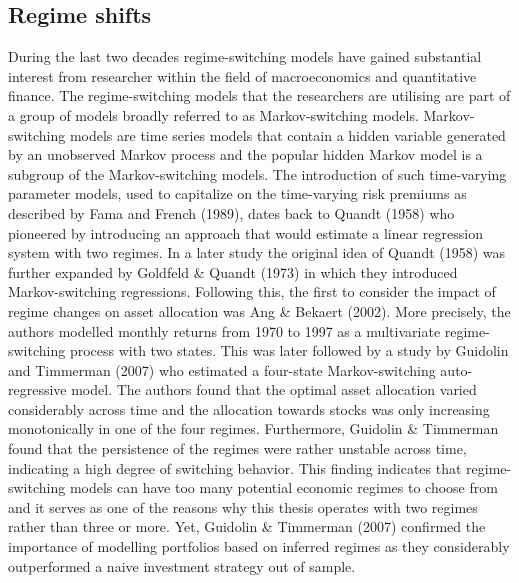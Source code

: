 \subsection{Regime shifts}
During the last two decades regime-switching models have gained substantial interest from researcher within the field of macroeconomics and quantitative finance. The regime-switching models that the researchers are utilising are part of a group of models broadly referred to as Markov-switching models. Markov-switching models are time series models that contain a hidden variable generated by an unobserved Markov process and the popular hidden Markov model is a subgroup of the Markov-switching models. The introduction of such time-varying parameter models, used to capitalize on the time-varying risk premiums as described by Fama and French (1989), dates back to Quandt (1958) who pioneered by introducing an approach that would estimate a linear regression system with two regimes. In a later study the original idea of Quandt (1958) was further expanded by Goldfeld \& Quandt (1973) in which they introduced Markov-switching regressions. Following this, the first to consider the impact of regime changes on asset allocation was Ang \& Bekaert (2002). More precisely, the authors modelled monthly returns from 1970 to 1997 as a multivariate regime-switching process with two states. This was later followed by a study by Guidolin and Timmerman (2007) who estimated a four-state Markov-switching auto-regressive model. The authors found that the optimal asset allocation varied considerably across time and the allocation towards stocks was only increasing monotonically in one of the four regimes. Furthermore, Guidolin \& Timmerman found that the persistence of the regimes were rather unstable across time, indicating a high degree of switching behavior. This finding indicates that regime-switching models can have too many potential economic regimes to choose from and it serves as one of the reasons why this thesis operates with two regimes rather than three or more. Yet, Guidolin \& Timmerman (2007) confirmed the importance of modelling portfolios based on inferred regimes as they considerably outperformed a naive investment strategy out of sample. 

